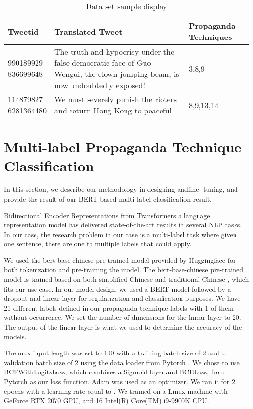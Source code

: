 \documentclass[sigconf]{acmart}
\begin{document}
\begin{table}[ht]
  \caption{Data set sample display}
  \label{tab:smp}
  \begin{tabular}{|p{1.5cm}|p{4cm}|p{1.5cm}|}
    \toprule
    Tweetid & Translated Tweet & Propaganda Techniques\\
    \midrule 
    \shortstack[r]{990189929\\836699648} & The truth and hypocrisy under  the false democratic face of Guo Wengui, the clown jumping beam, is now undoubtedly exposed! & 3,8,9\\
    \hline 
    \shortstack[r]{114879827\\6281364480} & We must severely punish the rioters and return Hong Kong to peaceful & 8,9,13,14\\
  \bottomrule
\end{tabular}
\end{table}

\section{Multi-label Propaganda Technique Classification}
In this section, we describe our methodology in designing andfine- tuning, and provide the result of our BERT-based multi-label classification result.

Bidirectional Encoder Representations from Transformers  \cite{devlin-etal-2019-bert} a language representation model has delivered state-of-the-art results in several NLP tasks. In our case, the research problem in our case is a multi-label task where given one sentence, there are one to multiple labels that could apply. 

We used the bert-base-chinese pre-trained model provided by Huggingface \cite{wolf-etal-2020-transformers} for both tokenization and pre-training the model. The bert-base-chinese pre-trained model is trained based on both simplified Chinese and traditional Chinese \cite{cui2019pre}, which fits our use case. In our model design, we used a BERT model followed by a dropout and linear layer for regularization and classification purposes. We have 21 different labels defined in our propaganda technique labels with 1 of them without occurrence. We set the number of dimensions for the linear layer to 20. The output of the linear layer is what we used to determine the accuracy of the models. 

The max input length was set to 100 with a training batch size of 2 and a validation batch size of 2 using the data loader from Pytorch \cite{NEURIPS2019_9015}. We chose to use BCEWithLogitsLoss, which combines a Sigmoid layer and BCELoss, from Pytorch  \cite{NEURIPS2019_9015} as our loss function. Adam \cite{1412.6980} was used as an optimizer. We ran it for 2 epochs with a learning rate equal to . We trained on a Linux machine with GeForce RTX 2070 GPU, and 16 Intel(R) Core(TM) i9-9900K CPU.
\end{document}
